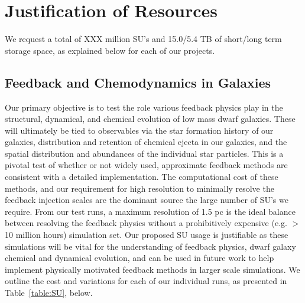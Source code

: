 \documentclass[11pt]{article}
\begin{document}
\section{Justification of Resources}

We request a total of XXX million SU's and 15.0/5.4 TB of short/long term storage space, as explained below for each of our projects.

\subsection{Feedback and Chemodynamics in Galaxies}

Our primary objective is to test the role various feedback physics play in the structural, dynamical, and chemical evolution of low mass dwarf galaxies. These will ultimately be tied to observables via the star formation history of our galaxies, distribution and retention of chemical ejecta in our galaxies, and the spatial distribution and abundances of the individual star particles. This is a pivotal test of whether or not widely used, approximate feedback methods are consistent with a detailed implementation. The computational cost of these methods, and our requirement for high resolution to minimally resolve the feedback injection scales are the dominant source the large number of SU's we require. From our test runs, a  maximum resolution of 1.5 pc is the ideal balance between resolving the feedback physics without a prohibitively expensive (e.g. $>$ 10 million hours) simulation set. Our proposed SU usage is justifiable as these simulations will be vital for the understanding of feedback physics, dwarf galaxy chemical and dynamical evolution, and can be used in future work to help implement physically motivated feedback methods in larger scale simulations. We outline the cost and variations for each of our individual runs, as presented in Table~\ref{table:SU}, below.
\end{document}
